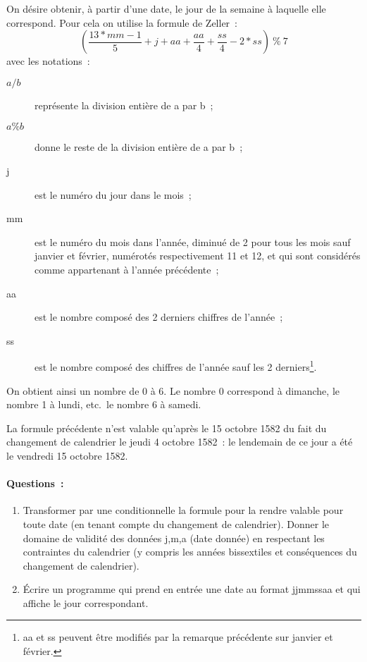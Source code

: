 \begin{exercice}
On d\'esire obtenir, \`a partir d'une date, le jour de la semaine \`a
laquelle elle correspond. Pour cela on utilise la formule de Zeller~:
$$
\left(\frac{13*mm-1}{5}+j+aa+\frac{aa}{4}+\frac{ss}{4}-2*ss \right)
~\%~7
$$
avec les notations~:
\begin{description}
  \item[${a}/{b}$] repr\'esente la division enti\`ere de a par
    b~;
  \item[$a \% b$] donne le reste de la division enti\`ere de a par
    b~;
  \item[j] est le num\'ero du jour dans le mois~;
  \item[mm] est le num\'ero du mois dans l'ann\'ee, diminu\'e de 2
    pour tous les mois sauf janvier et f\'evrier, num\'erot\'es
    respectivement 11 et 12, et qui sont consid\'er\'es comme
    appartenant \`a l'ann\'ee pr\'ec\'edente~;
  \item[aa] est le nombre compos\'e des 2 derniers chiffres de
    l'ann\'ee~;
  \item[ss] est le nombre compos\'e des chiffres de l'ann\'ee sauf
    les 2 derniers\footnote{ aa et ss peuvent \^etre modifi\'es
      par la remarque pr\'ec\'edente sur janvier et f\'evrier.  }.
\end{description}

On obtient ainsi un nombre de 0 \`a 6. Le nombre 0 correspond \`a
dimanche, le nombre 1 \`a lundi, etc.\ le nombre 6 \`a samedi.
    
La formule pr\'ec\'edente n'est  valable qu'apr\`es le 15 octobre 1582
du   fait du changement  de calendrier  le jeudi 4  octobre 1582~: le
lendemain de ce jour a \'et\'e le vendredi 15 octobre 1582.
\paragraph{Questions~:}
\begin{enumerate}
  \item  Transformer par une conditionnelle  la formule pour la rendre
    valable  pour  toute  date  (en   tenant compte du   changement de
    calendrier).  Donner le domaine  de validit\'e des donn\'ees j,m,a
    (date donn\'ee)   en respectant les  contraintes  du calendrier (y
    compris les ann\'ees  bissextiles et cons\'equences  du changement
    de calendrier).
  \item \'Ecrire un programme qui prend en entr\'ee une date au format
  jjmmssaa et qui affiche le jour correspondant.
\end{enumerate}
\end{exercice}
